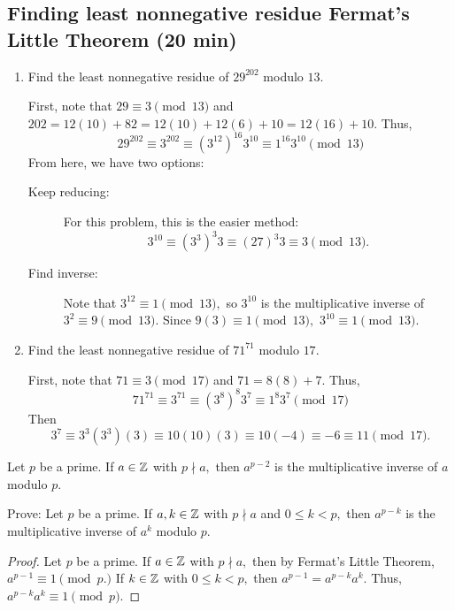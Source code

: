 \documentclass[letterpaper, 11 pt]{ximera}
\begin{document}
\subsection{Finding least nonnegative residue Fermat's Little Theorem (20 min)}
\begin{example}
\begin{enumerate}
 \item  Find the least nonnegative residue of $29^{202}$ modulo $13$. 
 
 First, note that $29\equiv 3\pmod{13}$ and $202=12(10)+82=12(10)+12(6)+10=12(16)+10.$  Thus,
 \[29^{202}\equiv3^{202}\equiv (3^{12})^{16}  3^{10}\equiv 1^{16} 3^{10}\pmod{13}\]
 From here,  we have two  options: 
\begin{description}
 \item[Keep reducing:] For this problem, this is the easier method: \[3^{10}\equiv (3^3)^3 3\equiv (27)^3 3\equiv 3\pmod{13}.\]
 \item[Find inverse:] Note that $3^{12}\equiv 1\pmod{13},$ so $3^{10}$ is the multiplicative inverse of $3^2\equiv 9\pmod{13}.$ Since $9(3)\equiv 1\pmod{13},$ $3^{10}\equiv 1\pmod{13}.$
\end{description}

\item Find the least nonnegative residue of $71^{71}$ modulo $17$. 

First, note that $71\equiv 3\pmod{17}$ and $71=8(8)+7.$  Thus,
 \[71^{71}\equiv3^{71}\equiv (3^{8})^{8}  3^{7}\equiv 1^{8} 3^{7}\pmod{17}\]
Then \[3^7\equiv 3^{3}(3^3)(3)\equiv 10(10)(3)\equiv 10(-4)\equiv -6\equiv 11\pmod{17}.\]
\end{enumerate}
\end{example}

\begin{cor*}[Corollary 2.14]\label{cor:inv-fermat}
 Let $p$ be a prime. If $a\in\mathbb Z$ with $p\nmid a,$ then $a^{p-2}$  is the multiplicative inverse of $a$ modulo $p$.
\end{cor*}

\begin{tps} Prove:
  Let $p$ be a prime. If $a,k\in\mathbb Z$ with $p\nmid a$ and $0\leq k<p,$ then $a^{p-k}$  is the multiplicative inverse of $a^k$ modulo $p$.
  
  
\begin{proof}
 Let $p$ be a prime. If $a\in\mathbb Z$ with $p\nmid a,$ then by Fermat's Little Theorem, $a^{p-1}\equiv 1\pmod{p.}$ If $k\in\mathbb Z$ with $0\leq k<p,$ then $a^{p-1}=a^{p-k}a^k.$ Thus, $a^{p-k}a^k\equiv 1\pmod{p}.$
\end{proof}
\end{tps}
\end{document}
